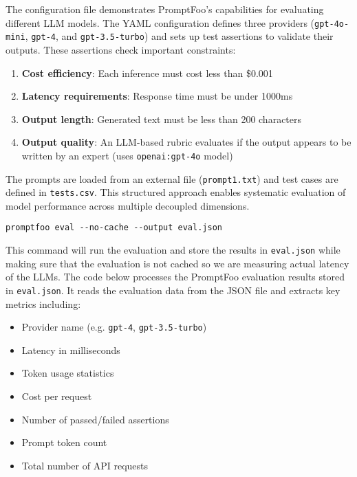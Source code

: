 The configuration file demonstrates PromptFoo's capabilities for evaluating different LLM models. The YAML configuration defines three providers (\texttt{gpt-4o-mini}, \texttt{gpt-4}, and \texttt{gpt-3.5-turbo}) and sets up test assertions to validate their outputs. These assertions check important constraints:

\begin{enumerate}
    \item \textbf{Cost efficiency}: Each inference must cost less than \$0.001
    \item \textbf{Latency requirements}: Response time must be under 1000ms 
    \item \textbf{Output length}: Generated text must be less than 200 characters
    \item \textbf{Output quality}: An LLM-based rubric evaluates if the output appears to be written by an expert (uses \texttt{openai:gpt-4o} model)
\end{enumerate}

The prompts are loaded from an external file (\texttt{prompt1.txt}) and test cases are defined in \texttt{tests.csv}. This structured approach enables systematic evaluation of model performance across multiple decoupled dimensions.

\begin{verbatim}
promptfoo eval --no-cache --output eval.json
\end{verbatim}

This command will run the evaluation and store the results in \texttt{eval.json} while making sure that the evaluation is not cached so we are measuring actual latency of the LLMs. The code below processes the PromptFoo evaluation results stored in \texttt{eval.json}. It reads the evaluation data from the JSON file and extracts key metrics including:

\begin{itemize}
    \item Provider name (e.g. \texttt{gpt-4}, \texttt{gpt-3.5-turbo})
    \item Latency in milliseconds 
    \item Token usage statistics
    \item Cost per request
    \item Number of passed/failed assertions
    \item Prompt token count
    \item Total number of API requests
\end{itemize}

